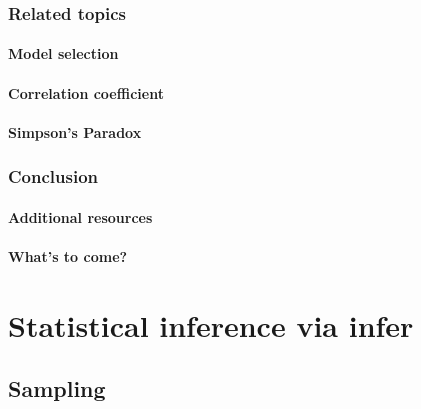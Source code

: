 \documentclass[12pt, krantz2,]{krantz}
\begin{document}
\hypertarget{related-topics-1}{%
\section{Related topics}\label{related-topics-1}}

\hypertarget{model-selection}{%
\subsection{Model selection}\label{model-selection}}

\hypertarget{correlationcoefficient2}{%
\subsection{Correlation coefficient}\label{correlationcoefficient2}}

\hypertarget{simpsonsparadox}{%
\subsection{Simpson's Paradox}\label{simpsonsparadox}}

\hypertarget{conclusion-5}{%
\section{Conclusion}\label{conclusion-5}}

\hypertarget{additional-resources-4}{%
\subsection{Additional resources}\label{additional-resources-4}}

\hypertarget{whats-to-come-5}{%
\subsection{What's to come?}\label{whats-to-come-5}}

\hypertarget{part-statistical-inference-via-infer}{%
\part{Statistical inference via infer}\label{part-statistical-inference-via-infer}}

\hypertarget{sampling}{%
\chapter{Sampling}\label{sampling}}
\end{document}

